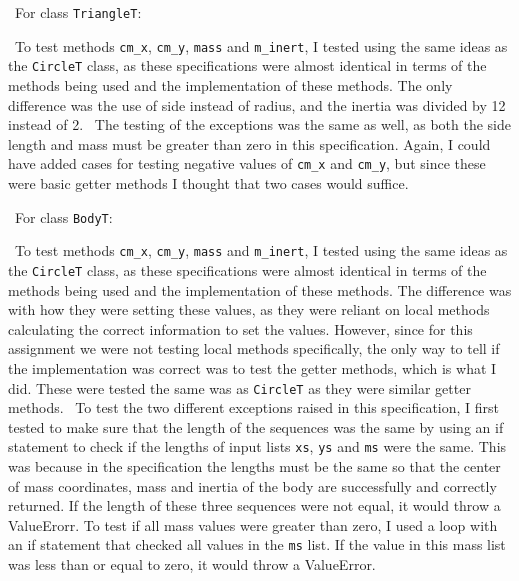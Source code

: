 \documentclass[12pt]{article}
\begin{document}
~\newline\noindent For class \verb|TriangleT|:

~\newline\noindent To test methods \verb|cm_x|, \verb|cm_y|, \verb|mass| and \verb|m_inert|, I 
tested using the same ideas as the \verb|CircleT| class, as these specifications were almost 
identical in terms of the methods being used and the implementation of these methods. The only 
difference was the use of side instead of radius, and the inertia was divided by 12 instead of 2.
~\newline\noindent The testing of the exceptions was the same as well, as both the side length 
and mass must be greater than zero in this specification. 
Again, I could have added cases for testing negative values of \verb|cm_x| and \verb|cm_y|, but 
since these were basic getter methods I thought that two cases would suffice. 

~\newline\noindent For class \verb|BodyT|:

~\newline\noindent To test methods \verb|cm_x|, \verb|cm_y|, \verb|mass| and \verb|m_inert|, 
I tested using the same ideas as the \verb|CircleT| class, as these specifications were almost 
identical in terms of the methods being used and the implementation of these methods. The 
difference was with how they were setting these values, as they were reliant on local methods 
calculating the correct information to set the values. However, since for this assignment we were
not testing local methods specifically, the only way to tell if the implementation was correct 
was to test the getter methods, which is what I did. These were tested the same was as 
\verb|CircleT| as they were similar getter methods. 
~\newline\noindent To test the two different exceptions raised in this specification, I first 
tested to make sure that the length of the sequences was the same by using an if statement to 
check if the lengths of input lists \verb|xs|, \verb|ys| and \verb|ms| were the same. This was 
because in the specification the lengths must be the same so that the center of mass coordinates,
mass and inertia of the body are successfully and correctly returned. If the length of these 
three sequences were not equal, it would throw a ValueErorr. 
To test if all mass values were greater than zero, I used a loop with an if statement that 
checked all values in the \verb|ms| list. If the value in this mass list was less than or equal
to zero, it would throw a ValueError. 
\end{document}

